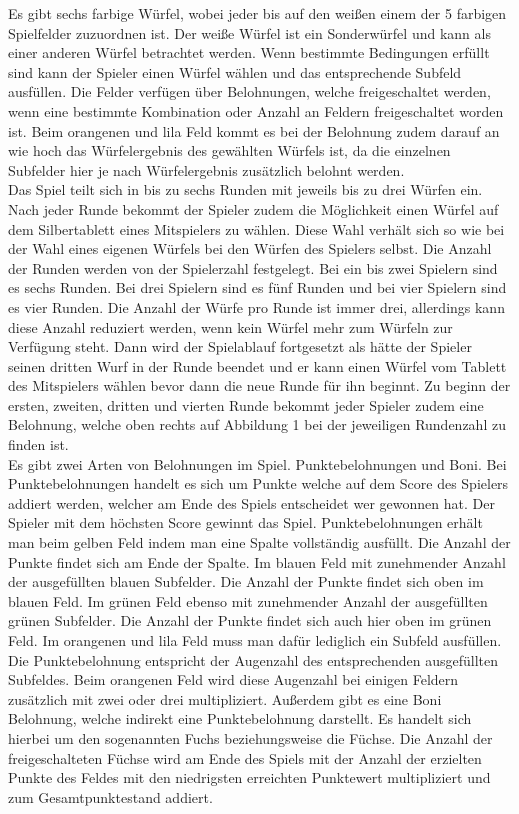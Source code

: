 Es gibt sechs farbige Würfel, wobei jeder bis auf den weißen einem der 5 farbigen Spielfelder zuzuordnen ist. Der weiße Würfel ist ein Sonderwürfel und kann als einer anderen Würfel betrachtet werden. Wenn bestimmte Bedingungen erfüllt sind kann der Spieler einen Würfel wählen und das entsprechende Subfeld ausfüllen. Die Felder verfügen über Belohnungen, welche freigeschaltet werden, wenn eine bestimmte Kombination oder Anzahl an Feldern freigeschaltet worden ist. Beim orangenen und lila Feld kommt es bei der Belohnung zudem darauf an wie hoch das Würfelergebnis des gewählten Würfels ist, da die einzelnen Subfelder hier je nach Würfelergebnis zusätzlich belohnt werden.
\\
Das Spiel teilt sich in bis zu sechs Runden mit jeweils bis zu drei Würfen ein. Nach jeder Runde bekommt der Spieler zudem die Möglichkeit einen Würfel auf dem Silbertablett eines Mitspielers zu wählen. Diese Wahl verhält sich so wie bei der Wahl eines eigenen Würfels bei den Würfen des Spielers selbst. Die Anzahl der Runden werden von der Spielerzahl festgelegt. Bei ein bis zwei Spielern sind es sechs Runden. Bei drei Spielern sind es fünf Runden und bei vier Spielern sind es vier Runden. Die Anzahl der Würfe pro Runde ist immer drei, allerdings kann diese Anzahl reduziert werden, wenn kein Würfel mehr zum Würfeln zur Verfügung steht. Dann wird der Spielablauf fortgesetzt als hätte der Spieler seinen dritten Wurf in der Runde beendet und er kann einen Würfel vom Tablett des Mitspielers wählen bevor dann die neue Runde für ihn beginnt. Zu beginn der ersten, zweiten, dritten und vierten Runde bekommt jeder Spieler zudem eine Belohnung, welche oben rechts auf Abbildung 1 bei der jeweiligen Rundenzahl zu finden ist.
\\
Es gibt zwei Arten von Belohnungen im Spiel. Punktebelohnungen und Boni. Bei Punktebelohnungen handelt es sich um Punkte welche auf dem Score des Spielers addiert werden, welcher am Ende des Spiels entscheidet wer gewonnen hat. Der Spieler mit dem höchsten Score gewinnt das Spiel. Punktebelohnungen erhält man beim gelben Feld indem man eine Spalte vollständig ausfüllt. Die Anzahl der Punkte findet sich am Ende der Spalte. Im blauen Feld mit zunehmender Anzahl der ausgefüllten blauen Subfelder. Die Anzahl der Punkte findet sich oben im blauen Feld. Im grünen Feld ebenso mit zunehmender Anzahl der ausgefüllten grünen Subfelder. Die Anzahl der Punkte findet sich auch hier oben im grünen Feld. Im orangenen und lila Feld muss man dafür lediglich ein Subfeld ausfüllen. Die Punktebelohnung entspricht der Augenzahl des entsprechenden ausgefüllten Subfeldes. Beim orangenen Feld wird diese Augenzahl bei einigen Feldern zusätzlich mit zwei oder drei multipliziert. Außerdem gibt es eine Boni Belohnung, welche indirekt eine Punktebelohnung darstellt. Es handelt sich hierbei um den sogenannten Fuchs beziehungsweise die Füchse. Die Anzahl der freigeschalteten Füchse wird am Ende des Spiels mit der Anzahl der erzielten Punkte des Feldes mit den niedrigsten erreichten Punktewert multipliziert und zum Gesamtpunktestand addiert.

